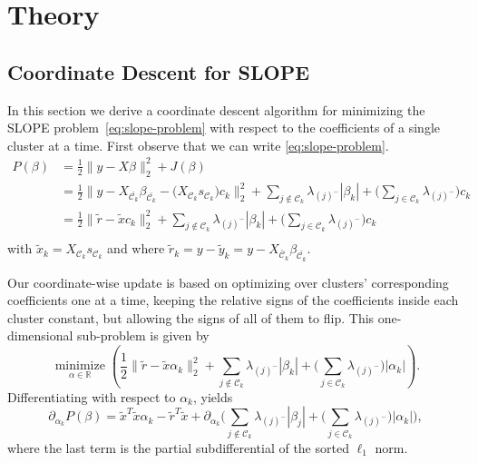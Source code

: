 
\section{Theory}\label{sec:theory}

\subsection{Coordinate Descent for SLOPE}%
\label{sec:coordinate-updates}

In this section we derive a coordinate descent algorithm for minimizing the SLOPE problem~\eqref{eq:slope-problem} with respect to the coefficients of a single cluster at a time.
First observe that we can write \eqref{eq:slope-problem}.
\[
  \begin{aligned}
    P(\beta) & =  \frac{1}{2} \lVert y - X\beta\rVert_2^2 + J(\beta)                                                                                                                                                                                                                \\
             & = \frac{1}{2} \lVert y - X_{\bar{\mathcal{C}_k}} \beta_{\bar{\mathcal{C}_k}} - \big(X_{\mathcal{C}_k} s_{\mathcal{C}_k}\big)c_k  \rVert_2^2 + \sum_{j \notin {\mathcal{C}_k}} \lambda_{(j)^-}|\beta_k| + \bigg(\sum_{j \in {\mathcal{C}_k}} \lambda_{(j)^-}\bigg)c_k \\
             & = \frac{1}{2} \lVert \tilde r - \tilde x c_k \rVert_2^2 + \sum_{j \notin {\mathcal{C}_k}} \lambda_{(j)^-}|\beta_k| + \bigg(\sum_{j \in {\mathcal{C}_k}} \lambda_{(j)^-}\bigg)c_k                                                                                     \\
  \end{aligned}
\]
with \( \tilde x_k = X_{\mathcal{C}_k} s_{\mathcal{C}_k}\) and
where \(\tilde r_k = y - \tilde y_k = y - X_{\bar{\mathcal{C}}_k} \beta_{\bar{\mathcal{C}_k}}\).

Our coordinate-wise update is based on optimizing over clusters' corresponding coefficients one at a time, keeping the relative signs of the coefficients inside each cluster constant, but allowing the signs of all of them to flip. This one-dimensional sub-problem is given by
\begin{equation*}
  \operatorname*{minimize}_{\alpha \in \mathbb{R}} \left( \frac{1}{2} \lVert \tilde r - \tilde x \alpha_k \rVert_2^2 + \sum_{j \notin {\mathcal{C}_k}} \lambda_{(j)^-}|\beta_k| + \bigg(\sum_{j \in {\mathcal{C}_k}} \lambda_{(j)^-}\bigg)|\alpha_k|\right).
\end{equation*}
Differentiating with respect to \(\alpha_k\), yields
\begin{equation}
  \label{eq:cluster-grad}
  \partial_{\alpha_k}
  P(\beta) = \tilde x^T \tilde x \alpha_k - \tilde r^T \tilde x +
  \partial_{\alpha_k} \Bigg(\sum_{j \notin \mathcal{C}_k}\lambda_{(j)^-}
  |\beta_j| + \bigg(\sum_{j \in {\mathcal{C}_k}} \lambda_{(j)^-}\bigg)|\alpha_k|
  \Bigg),
\end{equation}
where the last term is the partial subdifferential of the sorted \(\ell_1\)
norm.

